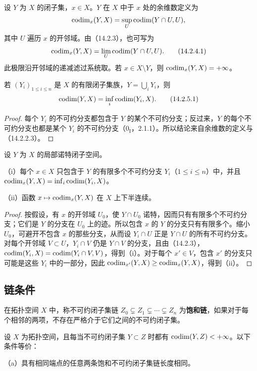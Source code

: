 设 $Y$ 为 $X$ 的闭子集，$x\in X$。$Y$ 在 $X$ 中于 $x$ 处的余维数定义为
\[
 \operatorname{codim}_x(Y,X)=\sup_U\operatorname{codim}(Y\cap U,U),
\]
其中 $U$ 遍历 $x$ 的开邻域。由（14.2.3），也可写为
\begin{equation}
 \operatorname{codim}_x(Y,X)=\lim_U\operatorname{codim}(Y\cap U,U).\tag{14.2.4.1}
\end{equation}
此极限沿开邻域的递减滤过系统取。若 $x\in X\setminus Y$，则 $\operatorname{codim}_x(Y,X)=+\infty$。

若 $(Y_i)_{1\leq i\leq n}$ 是 $X$ 的有限闭子集族，$Y=\bigcup_iY_i$，则
\begin{equation}
 \operatorname{codim}(Y,X)=\inf_i\operatorname{codim}(Y_i,X).\tag{14.2.5.1}
\end{equation}
\begin{proof}
每个 $Y_i$ 的不可约分支都包含于 $Y$ 的某个不可约分支；反过来，$Y$ 的每个不可约分支也都是某个 $Y_i$ 的不可约分支（$0_{\mathrm I}$，2.1.1）。所以结论来自余维数的定义与（14.2.2.3）。
\end{proof}

设 $Y$ 为 $X$ 的局部诺特闭子空间。

（i）每个 $x\in X$ 只包含于 $Y$ 的有限多个不可约分支 $Y_i$（$1\leq i\leq n$）中，并且
$\operatorname{codim}_x(Y,X)=\inf_i\operatorname{codim}(Y_i,X)$。

（ii）函数 $x\mapsto\operatorname{codim}_x(Y,X)$ 在 $X$ 上下半连续。
\begin{proof}
按假设，有 $x$ 的开邻域 $U_0$，使 $Y\cap U_0$ 诺特，因而只有有限多个不可约分支；它们是 $Y$ 的分支在 $U_0$ 上的迹。所以包含 $x$ 的 $Y$ 的分支只有有限多个。缩小 $U_0$，可避开不包含 $x$ 的那些分支，从而设 $Y_i\cap U$ 正是 $Y\cap U$ 的所有不可约分支。对每个开邻域 $V\subset U$，$Y_i\cap V$ 仍是 $Y\cap V$ 的分支，且由（14.2.3），
$\operatorname{codim}(Y_i,X)=\operatorname{codim}(Y_i\cap V,V)$，得到（i）。对于每个 $x'\in V$，包含 $x'$ 的分支只可能是这些 $Y_i$ 中的一部分，因此
$\operatorname{codim}_{x'}(Y,X)\geq\operatorname{codim}_x(Y,X)$，得到（ii）。
\end{proof}

\subsection{链条件}
在拓扑空间 $X$ 中，称不可约闭子集链
$Z_0\subsetneq Z_1\subsetneq\cdots\subsetneq Z_n$ 为\textbf{饱和链}，如果对于每个相邻的两项，不存在严格介于它们之间的不可约闭子集。

设 $X$ 为拓扑空间，且每当不可约闭子集 $Y\subset Z$ 时都有 $\operatorname{codim}(Y,Z)<+\infty$。以下条件等价：

（a）具有相同端点的任意两条饱和不可约闭子集链长度相同。

